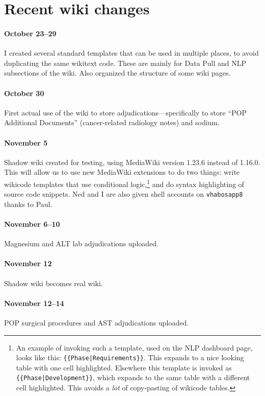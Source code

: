 \documentclass{tufte-handout}
\begin{document}
\section{Recent wiki changes}

\paragraph{October 23--29} I created several standard templates that
can be used in multiple places, to avoid duplicating the same wikitext
code. These are mainly for Data Pull and NLP subsections of the wiki.
Also organized the structure of some wiki pages.

\paragraph{October 30} First actual use of the wiki to store
adjudications---specifically to store ``POP Additional Documents''
(cancer-related radiology notes) and sodium.

\paragraph{November 5} Shadow wiki created for testing, using 
MediaWiki version 1.23.6 instead of 1.16.0. This will allow us to use
new MediaWiki extensions to do two things: write wikicode templates
that use conditional logic,\footnote{An example of invoking such a
  template, used on the NLP dashboard page, looks like this:
  \texttt{\{\{Phase|Requirements\}\}}. This expands to a nice looking
  table with one cell highlighted. Elsewhere this template is invoked
  as \texttt{\{\{Phase|Development\}\}}, which expands to the same
  table with a different cell highlighted. This avoids a \emph{lot} of
  copy-pasting of wikicode tables.} and do syntax highlighting of
source code snippets. Ned and I are also given shell accounts on
\texttt{vhabosapp8} thanks to Paul.

\paragraph{November 6--10} Magnesium and ALT lab adjudications uploaded.

\paragraph{November 12} Shadow wiki becomes real wiki.

\paragraph{November 12--14} POP surgical procedures and AST
adjudications uploaded.
\end{document}
